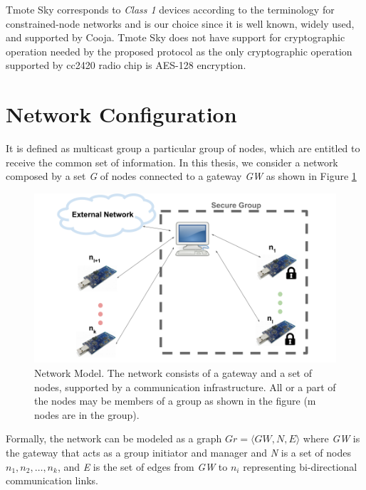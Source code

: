 Tmote Sky corresponds to \textit{Class 1} devices according to the terminology for constrained-node networks \cite{Bennett2014TerminologyNetworks} and is our choice since it is well known, widely used, and supported by Cooja.
Tmote Sky does not have support for cryptographic operation needed by the proposed protocol as the only cryptographic operation supported by cc2420 radio chip is AES-128 encryption.

\section{Network Configuration}
It is defined as multicast group a particular group of nodes, which are entitled to receive the common set of information.
In  this  thesis,  we  consider  a  network  composed  by  a  set \textit{G} of nodes connected to a gateway \textit{GW} as shown in Figure \ref{fig_network}

\begin{figure}[!h]
\centering
\includegraphics[width=5in]{images/network2.png}
\caption{Network Model. The network consists of a gateway and a set of nodes, supported by a communication infrastructure. All or a part of the nodes may be members of a group as shown in the figure (m nodes are in the group).}
\label{fig_network}
\end{figure}
Formally, the network can be modeled as a graph $Gr = \langle GW, N, E\rangle$ where \textit{GW} is the gateway that acts as a group initiator and manager and \textit{N} is a set of nodes $n_1, n_2, \dots, n_k$, and \textit{E} is the set of edges from \textit{GW} to $n_i$ representing bi-directional communication links.

